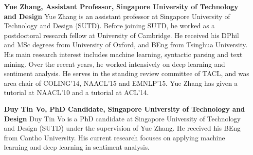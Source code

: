 \begin{bio}
\textbf{ Yue Zhang, Assistant Professor, Singapore University of Technology and Design}
 Yue Zhang is an assistant professor at Singapore University of Technology and Design (SUTD). Before joining SUTD, he worked as a postdoctoral research fellow at University of Cambridge. He received his DPhil and MSc degrees from University of Oxford, and BEng from Tsinghua University. His main research interest includes machine learning, syntactic parsing and text mining. Over the recent years, he worked intensively on deep learning and sentiment analysis. He serves in the standing review committee of TACL, and was area chair of COLING'14, NAACL'15 and EMNLP'15. Yue Zhang has given a tutorial at NAACL'10 and a tutorial at ACL'14.

\textbf{Duy Tin Vo, PhD Candidate, Singapore University of Technology and Design}
 Duy Tin Vo is a PhD candidate at Singapore University of Technology and Design (SUTD) under the supervision of Yue Zhang. He received his BEng from Cantho University. His current research focuses on applying machine learning and deep learning in sentiment analysis. 
  
\end{bio}

